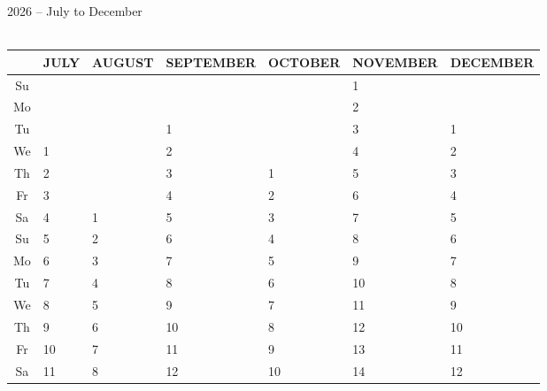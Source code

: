 \documentclass[a4paper]{article}
\newcommand{\monthstrut}{\rule{0pt}{12pt}}
\newcommand{\datestrut}{\rule{0pt}{12pt}}
\begin{document}
\begin{center}
\hspace{1cm} {\LARGE 2026 -- July to December}\\
{\ } \\
\begin{tabular}{|c||p{2.5cm}|p{2.5cm}|p{2.5cm}|p{2.5cm}|p{2.5cm}|p{2.5cm}|}
\hline
 \multicolumn{1}{|c||}{\monthstrut\ }
 & \multicolumn{1}{|c|}{JULY}
 & \multicolumn{1}{|c|}{AUGUST}
 & \multicolumn{1}{|c|}{SEPTEMBER}
 & \multicolumn{1}{|c|}{OCTOBER}
 & \multicolumn{1}{|c|}{NOVEMBER}
 & \multicolumn{1}{|c|}{DECEMBER}
\\
\hline
\hline
\datestrut Su &  &  &  &  & 1 &  \\
\hline\hline
\datestrut Mo &  &  &  &  & 2 &  \\
\cline{1-1}\cline{4-4}\cline{6-6}\cline{7-7}
\datestrut Tu &  &  & 1 &  & 3 & 1 \\
\cline{1-1}\cline{2-2}\cline{4-4}\cline{6-6}\cline{7-7}
\datestrut We & 1 &  & 2 &  & 4 & 2 \\
\cline{1-1}\cline{2-2}\cline{4-4}\cline{5-5}\cline{6-6}\cline{7-7}
\datestrut Th & 2 &  & 3 & 1 & 5 & 3 \\
\cline{1-1}\cline{2-2}\cline{4-4}\cline{5-5}\cline{6-6}\cline{7-7}
\datestrut Fr & 3 &  & 4 & 2 & 6 & 4 \\
\cline{1-1}\cline{2-2}\cline{3-3}\cline{4-4}\cline{5-5}\cline{6-6}\cline{7-7}
\datestrut Sa & 4 & 1 & 5 & 3 & 7 & 5 \\
\cline{1-1}\cline{2-2}\cline{3-3}\cline{4-4}\cline{5-5}\cline{6-6}\cline{7-7}
\datestrut Su & 5 & 2 & 6 & 4 & 8 & 6 \\
\hline\hline
\datestrut Mo & 6 & 3 & 7 & 5 & 9 & 7 \\
\cline{1-1}\cline{2-2}\cline{3-3}\cline{4-4}\cline{5-5}\cline{6-6}\cline{7-7}
\datestrut Tu & 7 & 4 & 8 & 6 & 10 & 8 \\
\cline{1-1}\cline{2-2}\cline{3-3}\cline{4-4}\cline{5-5}\cline{6-6}\cline{7-7}
\datestrut We & 8 & 5 & 9 & 7 & 11 & 9 \\
\cline{1-1}\cline{2-2}\cline{3-3}\cline{4-4}\cline{5-5}\cline{6-6}\cline{7-7}
\datestrut Th & 9 & 6 & 10 & 8 & 12 & 10 \\
\cline{1-1}\cline{2-2}\cline{3-3}\cline{4-4}\cline{5-5}\cline{6-6}\cline{7-7}
\datestrut Fr & 10 & 7 & 11 & 9 & 13 & 11 \\
\cline{1-1}\cline{2-2}\cline{3-3}\cline{4-4}\cline{5-5}\cline{6-6}\cline{7-7}
\datestrut Sa & 11 & 8 & 12 & 10 & 14 & 12 \\
\cline{1-1}\cline{2-2}\cline{3-3}\cline{4-4}\cline{5-5}\cline{6-6}\cline{7-7}

\end{tabular}
\end{center}
\end{document}

